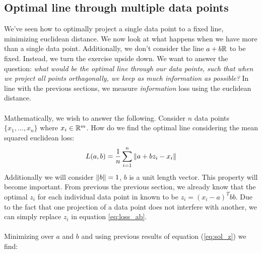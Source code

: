 \subsection{Optimal line through multiple data points}
We've seen how to optimally project a single data 
point to a fixed line, minimizing euclidean distance.
We now look at what happens when we have more than a single
data point. Additionally, we don't consider the line $a + b\mathbb{R}$
to be fixed. Instead, we turn the exercise upside down. We
want to answer the question: \textit{what would be the optimal
line through our data points, such that when we project all points
orthagonally, we keep as much information as possible?} In line
with the previous sections, we measure \textit{information} loss
using the euclidean distance.
\\\\
Mathematically, we wish to answer the following.
Consider $n$ data points $\{x_1,...,x_n\}$ where $x_i \in \mathbb{R}^m$.
How do we find the optimal line considering the mean 
squared euclidean loss:
\begin{equation}
\label{eq:loss_ab}
L(a,b) = \frac{1}{n}\sum_{i=1}^{n}\left\lVert a + bz_i - x_i\right\rVert
\end{equation}
Additionally we will consider $\left\lVert b\right\rVert = 1$, $b$ is a unit 
length vector. This property will become important.
From previous the previous section, we already know that the optimal
$z_i$ for each individual data point in known to be 
$z_i = (x_i-a)^Tbb$. Due to the fact that one projection
of a data point does not interfere with another, we can simply
replace $z_i$ in equation \ref{eq:loss_ab}.
\\\\
Minimizing over $a$ and $b$ and using previous 
results of equation (\ref{eq:sol_z}) we find:

